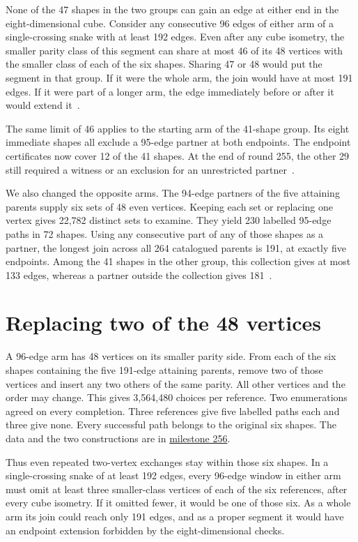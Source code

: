 \documentclass[11pt,a4paper]{article}
\begin{document}
None of the 47 shapes in the two groups can gain an edge at either
end in the eight-dimensional cube. Consider any consecutive 96
edges of either arm of a single-crossing snake with at least 192
edges. Even after any cube isometry, the smaller parity class of
this segment can share at most 46 of its 48 vertices with the
smaller class of each of the six shapes. Sharing 47 or 48 would
put the segment in that group. If it were the whole arm, the join
would have at most 191 edges. If it were part of a longer arm, the
edge immediately before or after it would extend it~\cite{exchange255}.

The same limit of 46 applies to the starting arm of the 41-shape
group. Its eight immediate shapes all exclude a 95-edge partner at
both endpoints. The endpoint certificates now cover 12 of the 41
shapes. At the end of round 255, the other 29 still required a witness or an exclusion for
an unrestricted partner~\cite{exchange255}.

We also changed the opposite arms. The 94-edge partners of the five
attaining parents supply six sets of 48 even vertices. Keeping each
set or replacing one vertex gives 22,782 distinct sets to examine.
They yield 230 labelled 95-edge paths in 72 shapes. Using any
consecutive part of any of those shapes as a partner, the longest
join across all 264 catalogued parents is 191, at exactly five
endpoints. Among the 41 shapes in the other group, this collection
gives at most 133 edges, whereas a partner outside the collection
gives 181~\cite{root248,exchange255}.

\section{Replacing two of the 48 vertices}
A 96-edge arm has 48 vertices on its smaller parity side. From each
of the six shapes containing the five 191-edge attaining parents, remove
two of those vertices and insert any two others of the same parity.
All other vertices and the order may change. This gives 3,564,480 choices
per reference. Two enumerations agreed on every completion. Three
references give five labelled paths each and three give none. Every
successful path belongs to the original six shapes. The data and the
two constructions are in \href{https://github.com/hironaka-iori/Snake-in-the-box-in-9/tree/main/milestones/256-two-exchange-parents}{milestone 256}.

Thus even repeated two-vertex exchanges stay within those six shapes.
In a single-crossing snake of at least 192 edges, every 96-edge window
in either arm must omit at least three smaller-class vertices of each
of the six references, after every cube isometry. If it omitted fewer,
it would be one of those six. As a whole arm its join could reach only
191 edges, and as a proper segment it would have an endpoint extension
forbidden by the eight-dimensional checks.
\end{document}
